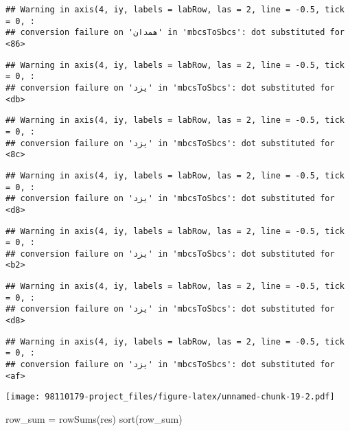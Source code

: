 \documentclass[
]{article}
\newenvironment{Shaded}{\begin{snugshade}}{\end{snugshade}}
\newcommand{\FunctionTok}[1]{\textcolor[rgb]{0.00,0.00,0.00}{#1}}
\newcommand{\NormalTok}[1]{#1}
\newcommand{\OtherTok}[1]{\textcolor[rgb]{0.56,0.35,0.01}{#1}}
\begin{document}
\begin{verbatim}
## Warning in axis(4, iy, labels = labRow, las = 2, line = -0.5, tick = 0, :
## conversion failure on 'همدان' in 'mbcsToSbcs': dot substituted for <86>
\end{verbatim}

\begin{verbatim}
## Warning in axis(4, iy, labels = labRow, las = 2, line = -0.5, tick = 0, :
## conversion failure on 'یزد' in 'mbcsToSbcs': dot substituted for <db>
\end{verbatim}

\begin{verbatim}
## Warning in axis(4, iy, labels = labRow, las = 2, line = -0.5, tick = 0, :
## conversion failure on 'یزد' in 'mbcsToSbcs': dot substituted for <8c>
\end{verbatim}

\begin{verbatim}
## Warning in axis(4, iy, labels = labRow, las = 2, line = -0.5, tick = 0, :
## conversion failure on 'یزد' in 'mbcsToSbcs': dot substituted for <d8>
\end{verbatim}

\begin{verbatim}
## Warning in axis(4, iy, labels = labRow, las = 2, line = -0.5, tick = 0, :
## conversion failure on 'یزد' in 'mbcsToSbcs': dot substituted for <b2>
\end{verbatim}

\begin{verbatim}
## Warning in axis(4, iy, labels = labRow, las = 2, line = -0.5, tick = 0, :
## conversion failure on 'یزد' in 'mbcsToSbcs': dot substituted for <d8>
\end{verbatim}

\begin{verbatim}
## Warning in axis(4, iy, labels = labRow, las = 2, line = -0.5, tick = 0, :
## conversion failure on 'یزد' in 'mbcsToSbcs': dot substituted for <af>
\end{verbatim}

\texttt{[image: 98110179-project\_files/figure-latex/unnamed-chunk-19-2.pdf]}

\begin{Shaded}
\begin{Highlighting}[]
\NormalTok{row\_sum }\OtherTok{=} \FunctionTok{rowSums}\NormalTok{(res)}
\FunctionTok{sort}\NormalTok{(row\_sum)}
\end{Highlighting}
\end{Shaded}
\end{document}
